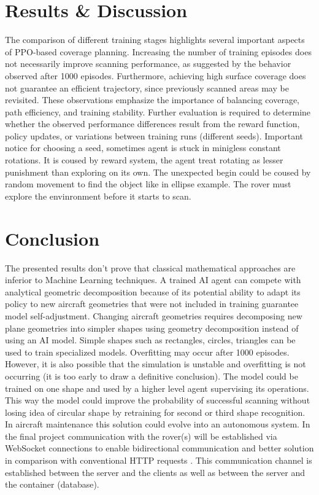 \documentclass[11pt,a4paper,oneside,onecolumn]{article}
\begin{document}
\section{Results \& Discussion}
The comparison of different training stages highlights several important aspects of PPO-based coverage planning. Increasing the number of training episodes does not necessarily improve scanning performance, as suggested by the behavior observed after 1000 episodes. Furthermore, achieving high surface coverage does not guarantee an efficient trajectory, since previously scanned areas may be revisited. These observations emphasize the importance of balancing coverage, path efficiency, and training stability. Further evaluation is required to determine whether the observed performance differences result from the reward function, policy updates, or variations between training runs (different seeds). Important notice for choosing a seed, sometimes agent is stuck in minigless constant rotations. It is coused by reward system, the agent treat rotating as lesser punishment than exploring on its own. The unexpected begin could be coused by random movement to find the object like in ellipse example. The rover must explore the envinronment before it starts to scan.

\section{Conclusion}

The presented results don't prove that classical mathematical approaches are inferior to Machine Learning techniques. A trained AI agent can compete with analytical geometric decomposition because of its potential ability to adapt its policy to new aircraft geometries that were not included in training guarantee model self-adjustment. Changing aircraft geometries requires decomposing new plane geometries into simpler shapes using geometry decomposition instead of using an AI model. Simple shapes such as rectangles, circles, triangles can be used to train specialized models. Overfitting may occur after 1000 episodes. However, it is also possible that the simulation is unstable and overfitting is not occurring (it is too early to draw a definitive conclusion). The model could be trained on one shape and used by a higher level agent supervising its operations. This way the model could improve the probability of successful scanning without losing idea of circular shape by retraining for second or third shape recognition. In aircraft maintenance this solution could evolve into an autonomous system. In the final project communication with the rover(s) will be established via WebSocket connections to enable bidirectional communication and better solution in comparison with conventional HTTP requests \cite{kufa2025pathplanning}. This communication channel is established between the server and the clients as well as between the server and the container (database).




\end{document}
